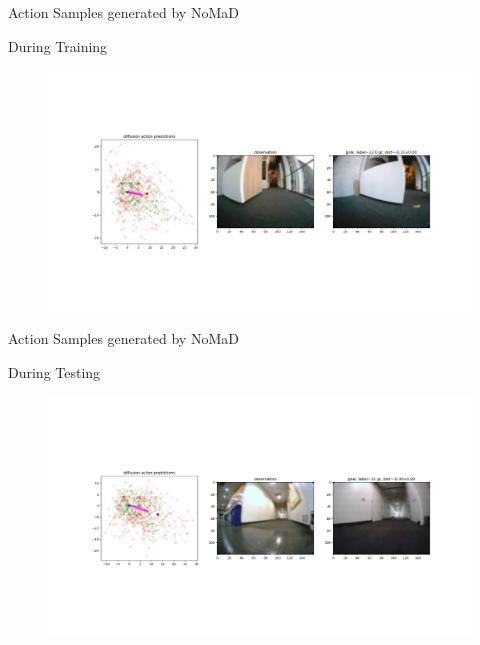 \documentclass{beamer}
\begin{document}
\begin{frame}{Action Samples generated by NoMaD}
    \begin{block}{During Training}
        \begin{figure}
            \includegraphics[width=1\linewidth]{images/train_action_sample.png}        \end{figure}
    \end{block}
\end{frame}
\begin{frame}{Action Samples generated by NoMaD}
    \begin{block}{During Testing}
        \begin{figure}
            \includegraphics[width=1\linewidth]{images/test_action_sample.png}        \end{figure}
    \end{block}
\end{frame}
\end{document}
